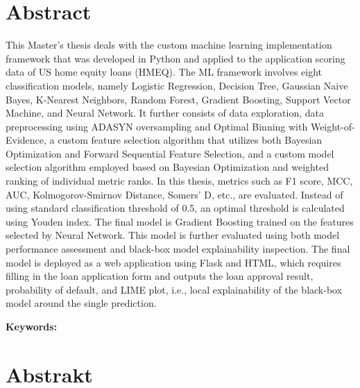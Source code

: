 \section*{Abstract}


This Master's thesis deals with the custom machine learning implementation framework that was developed in Python and applied to the application scoring data of US home equity loans (HMEQ).
The ML framework involves eight classification models, namely Logistic Regression, Decision Tree, Gaussian Naive Bayes, K-Nearest Neighbors, Random Forest, Gradient Boosting, Support Vector Machine, and Neural Network.
It further consists of data exploration, data preprocessing using ADASYN oversampling and Optimal Binning with Weight-of-Evidence, a custom feature selection algorithm that utilizes both Bayesian Optimization and Forward Sequential Feature Selection, and a custom model selection algorithm employed based on Bayesian Optimization and weighted ranking of individual metric ranks. In this thesis, metrics such as F1 score, MCC, AUC, Kolmogorov-Smirnov Distance, Somers' D, etc., are evaluated.
Instead of using standard classification threshold of 0.5, an optimal threshold is calculated using Youden index.
The final model is Gradient Boosting trained on the features selected by Neural Network. 
This model is further evaluated using both model performance assessment and black-box model explainability inspection.
The final model is deployed as a web application using Flask and HTML, which requires filling in the loan application form and outputs the loan approval result, probability of default, and LIME plot, i.e., local explainability of the black-box model around the single prediction.
\bigskip

\textbf{Keywords:} \Keywords


\bigskip

\newpage
\section*{Abstrakt}\label{abstract}


